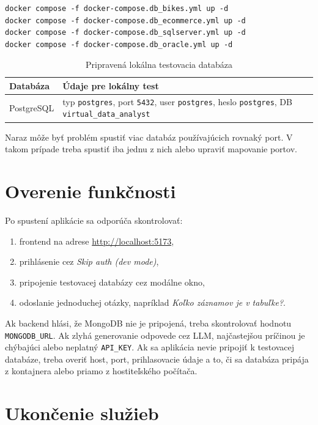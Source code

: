 \documentclass[a4paper, 12pt]{article}
\begin{document}
\begin{lstlisting}
docker compose -f docker-compose.db_bikes.yml up -d
docker compose -f docker-compose.db_ecommerce.yml up -d
docker compose -f docker-compose.db_sqlserver.yml up -d
docker compose -f docker-compose.db_oracle.yml up -d
\end{lstlisting}

\begin{table}[h]
\centering
\small
\begin{tabular}{p{4cm}p{9cm}}
\toprule
\textbf{Databáza} & \textbf{Údaje pre lokálny test} \\
\midrule
PostgreSQL &
typ \texttt{postgres}, port \texttt{5432}, user \texttt{postgres}, heslo \texttt{postgres}, DB \texttt{virtual\_data\_analyst} \\
\bottomrule
\end{tabular}
\caption{Pripravená lokálna testovacia databáza}
\end{table}

Naraz môže byť problém spustiť viac databáz používajúcich rovnaký port. V takom prípade treba spustiť iba jednu z nich alebo upraviť mapovanie portov.
\clearpage
\section{Overenie funkčnosti}

Po spustení aplikácie sa odporúča skontrolovať:

\begin{enumerate}
    \item frontend na adrese \url{http://localhost:5173},
    \item prihlásenie cez \textit{Skip auth (dev mode)},
    \item pripojenie testovacej databázy cez modálne okno,
    \item odoslanie jednoduchej otázky, napríklad \textit{Koľko záznamov je v tabuľke?}.
\end{enumerate}

Ak backend hlási, že MongoDB nie je pripojená, treba skontrolovať hodnotu \texttt{MONGODB\_URL}. Ak zlyhá generovanie odpovede cez LLM, najčastejšou príčinou je chýbajúci alebo neplatný \texttt{API\_KEY}. Ak sa aplikácia nevie pripojiť k testovacej databáze, treba overiť host, port, prihlasovacie údaje a to, či sa databáza pripája z kontajnera alebo priamo z hostiteľského počítača.

\section{Ukončenie služieb}
\end{document}
